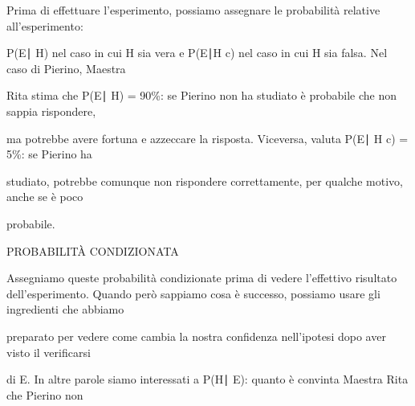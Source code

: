 \documentclass[a4paper,portrait,12pt]{article}
\begin{document}
\begin{flushleft}
Prima di effettuare l'esperimento, possiamo assegnare le probabilit\`{a} relative all'esperimento:
\end{flushleft}


\begin{flushleft}
P(E∣ H) nel caso in cui H sia vera e P(E∣H c) nel caso in cui H sia falsa. Nel caso di Pierino, Maestra
\end{flushleft}


\begin{flushleft}
Rita stima che P(E∣ H) = 90\%: se Pierino non ha studiato \`{e} probabile che non sappia rispondere,
\end{flushleft}


\begin{flushleft}
ma potrebbe avere fortuna e azzeccare la risposta. Viceversa, valuta P(E∣ H c) = 5\%: se Pierino ha
\end{flushleft}


\begin{flushleft}
studiato, potrebbe comunque non rispondere correttamente, per qualche motivo, anche se \`{e} poco
\end{flushleft}


\begin{flushleft}
probabile.
\end{flushleft}










\begin{flushleft}
PROBABILIT\`{A} CONDIZIONATA
\end{flushleft}





\begin{flushleft}
Assegniamo queste probabilit\`{a} condizionate prima di vedere l'effettivo risultato dell'esperimento. Quando per\`{o} sappiamo cosa \`{e} successo, possiamo usare gli ingredienti che abbiamo
\end{flushleft}


\begin{flushleft}
preparato per vedere come cambia la nostra confidenza nell'ipotesi dopo aver visto il verificarsi
\end{flushleft}


\begin{flushleft}
di E. In altre parole siamo interessati a P(H∣ E): quanto \`{e} convinta Maestra Rita che Pierino non
\end{flushleft}
\end{document}
